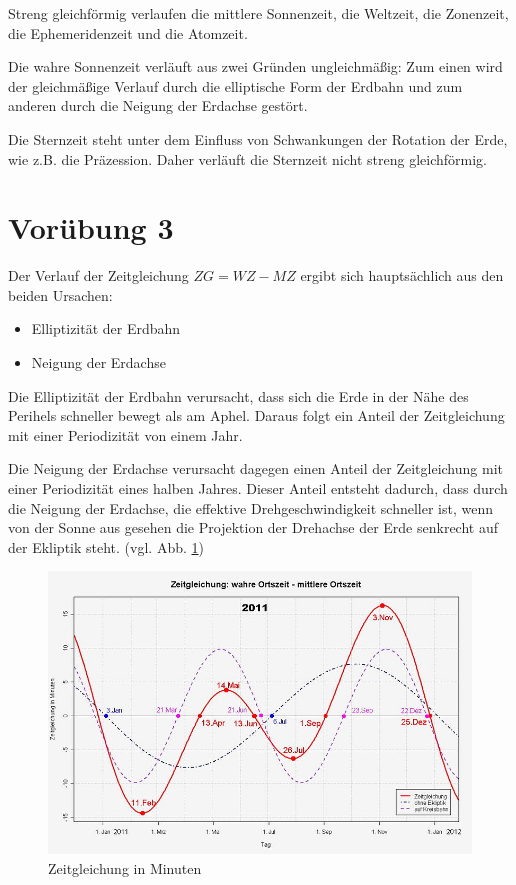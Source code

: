 \documentclass[titlepage]{scrartcl}
\begin{document}
Streng gleichförmig verlaufen die mittlere Sonnenzeit, die Weltzeit, die Zonenzeit, die Ephemeridenzeit und die Atomzeit.

Die wahre Sonnenzeit verläuft aus zwei Gründen ungleichmäßig: Zum einen wird der gleichmäßige Verlauf durch die elliptische Form der Erdbahn und zum anderen durch die Neigung der Erdachse gestört.

Die Sternzeit steht unter dem Einfluss von Schwankungen der Rotation der Erde, wie z.B. die Präzession. Daher verläuft die Sternzeit nicht streng gleichförmig.

\section{Vorübung 3}

Der Verlauf der Zeitgleichung $ ZG=WZ-MZ $ ergibt sich hauptsächlich aus den beiden Ursachen:

\begin{itemize}
\item Elliptizität der Erdbahn
\item Neigung der Erdachse
\end{itemize}
Die Elliptizität der Erdbahn verursacht, dass sich die Erde in der Nähe des Perihels schneller bewegt als am Aphel. Daraus folgt ein Anteil der Zeitgleichung mit einer Periodizität von einem Jahr.

Die Neigung der Erdachse verursacht dagegen einen Anteil der Zeitgleichung mit einer Periodizität eines halben Jahres. Dieser Anteil entsteht dadurch, dass durch die Neigung der Erdachse, die effektive Drehgeschwindigkeit schneller ist, wenn von der Sonne aus gesehen die Projektion der Drehachse der Erde senkrecht auf der Ekliptik steht. (vgl. Abb. \ref{fig:Zeitgleichung})

\begin{figure}
        \includegraphics[width=.9\textwidth]{images/Zeitgleichung}
\caption{ Zeitgleichung in Minuten }
\label{fig:Zeitgleichung}
\end{figure}
\end{document}
